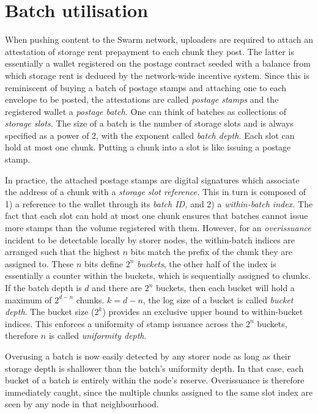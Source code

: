 \chapter{Batch utilisation}\label{sec:appendix-batch-utilisation}


When pushing content to the Swarm network, uploaders are required to
attach an attestation of storage rent prepayment to each chunk they
post. The latter is essentially a wallet registered on the postage
contract seeded with a balance from which storage rent is deduced by the
network-wide incentive system. Since this is reminiscent of buying a
batch of postage stamps and attaching one to each envelope to be posted,
the attestations are called \emph{postage stamps} and the registered
wallet a \emph{postage batch.} One can think of batches as collections
of \emph{storage slots.} The size of a batch is the number of storage
slots and is always specified as a power of 2, with the exponent
called \emph{batch depth.} Each slot can hold at most one chunk.
Putting a chunk into a slot is like issuing a postage stamp.

In practice, the attached postage stamps are digital signatures which
associate the address of a chunk with a \emph{storage slot reference.}
This in turn is composed of 1) a reference to the wallet through its
\emph{batch ID,} and 2) a \emph{within-batch index.} The fact that each
slot can hold at most one chunk ensures that batches cannot issue more
stamps than the volume registered with them. However, for an
\emph{overissuance} incident to be detectable locally by storer nodes,
the within-batch indices are arranged such that the highest $n$ bits
match the prefix of the chunk they are assigned to. These $n$ bits
define $2^n$ \emph{buckets}, the other half of the index is essentially a counter within the buckets, which is
sequentially assigned to chunks. If
the batch depth is $d$ and there
are $2^n$ buckets, then each bucket will hold a maximum of $2^{d-n}$
chunks. $k=d-n$, the log size of a bucket is called
\emph{bucket depth}. The bucket size ($2^k$) provides an exclusive upper bound to
within-bucket indices. This enforces a uniformity of stamp issuance across the $2^n$ buckets, therefore $n$ is called \emph{uniformity depth}.

Overusing a batch is now easily detected by any storer node as long as
their storage depth is shallower than the batch's uniformity depth. In
that case, each bucket of a batch is entirely within the node's reserve.
Overissuance is therefore immediately caught, since the multiple chunks 
assigned to the same slot index are seen by any node in that
neighbourhood.

